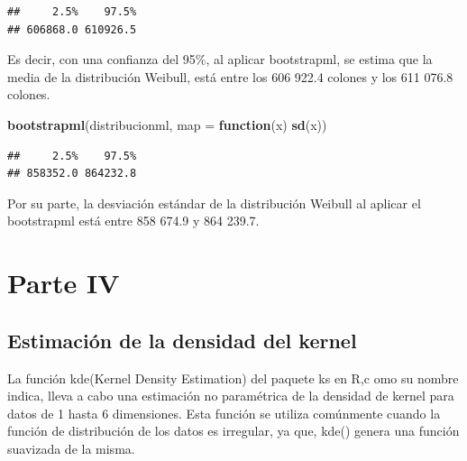 \documentclass[
]{article}
\newenvironment{Shaded}{\begin{snugshade}}{\end{snugshade}}
\newcommand{\AttributeTok}[1]{\textcolor[rgb]{0.13,0.29,0.53}{#1}}
\newcommand{\ControlFlowTok}[1]{\textcolor[rgb]{0.13,0.29,0.53}{\textbf{#1}}}
\newcommand{\DecValTok}[1]{\textcolor[rgb]{0.00,0.00,0.81}{#1}}
\newcommand{\FloatTok}[1]{\textcolor[rgb]{0.00,0.00,0.81}{#1}}
\newcommand{\FunctionTok}[1]{\textcolor[rgb]{0.13,0.29,0.53}{\textbf{#1}}}
\newcommand{\NormalTok}[1]{#1}
\newcommand{\SpecialCharTok}[1]{\textcolor[rgb]{0.81,0.36,0.00}{\textbf{#1}}}
\newcommand{\StringTok}[1]{\textcolor[rgb]{0.31,0.60,0.02}{#1}}
\begin{document}
\begin{verbatim}
##     2.5%    97.5% 
## 606868.0 610926.5
\end{verbatim}

Es decir, con una confianza del 95\%, al aplicar bootstrapml, se estima
que la media de la distribución Weibull, está entre los 606 922.4
colones y los 611 076.8 colones.

\begin{Shaded}
\begin{Highlighting}[]
\FunctionTok{bootstrapml}\NormalTok{(distribucionml, }
            \AttributeTok{map =} \ControlFlowTok{function}\NormalTok{(x) }\FunctionTok{sd}\NormalTok{(x))}
\end{Highlighting}
\end{Shaded}

\begin{verbatim}
##     2.5%    97.5% 
## 858352.0 864232.8
\end{verbatim}

Por su parte, la desviación estándar de la distribución Weibull al
aplicar el bootstrapml está entre 858 674.9 y 864 239.7.

\hypertarget{parte-iv}{%
\section{Parte IV}\label{parte-iv}}

\hypertarget{estimaciuxf3n-de-la-densidad-del-kernel}{%
\subsection{Estimación de la densidad del
kernel}\label{estimaciuxf3n-de-la-densidad-del-kernel}}

La función kde(Kernel Density Estimation) del paquete ks en R,c omo su
nombre indica, lleva a cabo una estimación no paramétrica de la densidad
de kernel para datos de 1 hasta 6 dimensiones. Esta función se utiliza
comúnmente cuando la función de distribución de los datos es irregular,
ya que, kde() genera una función suavizada de la misma.

\begin{Shaded}
\end{Shaded}
\end{document}
